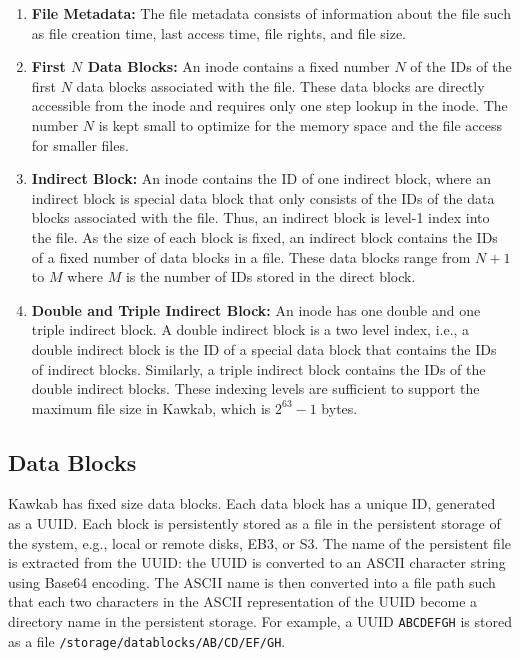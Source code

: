 \documentclass[]{article}
\newcommand{\subtopic}[1]{\vspace{1.5pt} \noindent \textbf{#1}}
\begin{document}
\begin{enumerate}
  \item \subtopic{File Metadata:} The file metadata consists of information
        about the file such as file creation time, last access time, file
        rights, and file size.

	\item \subtopic{First $N$ Data Blocks:} An inode contains a fixed number
$N$ of the IDs of the first $N$ data blocks associated with the file.
These data blocks are directly accessible from the inode and requires
only one step lookup in the inode.
The number $N$ is kept small to optimize for the memory space and the file
access for smaller files. 

  \item \subtopic{Indirect Block:} 
An inode contains the ID of one indirect block, where an indirect block is
special data block that only consists of the IDs of the data blocks associated
with the file. Thus, an indirect block is level-1 index into the file.
As the size of each block is fixed, an indirect block contains the
IDs of a fixed number of data blocks in a file. These data blocks 
range from $N+1$ to $M$ where $M$ is the number of IDs stored in the
direct block.

  \item \subtopic{Double and Triple Indirect Block:}
An inode has one double and one triple indirect block. A double indirect block is a two
level index, i.e., a double indirect block is the ID of a special data block that contains
the IDs of indirect blocks. Similarly, a triple indirect block contains the IDs of the
double indirect blocks. These indexing levels are sufficient to support the maximum 
file size in Kawkab, which is $2^{63}-1$ bytes.

\end{enumerate}

\subsection{Data Blocks} Kawkab has fixed size data blocks. Each data block has
a unique ID, generated as a UUID.  Each block is persistently stored as a file
in the persistent storage of the system, e.g., local or remote disks, EB3, or
S3.  The name of the persistent file is extracted from the UUID: the UUID is
converted to an ASCII character string using Base64 encoding.  The ASCII name
is then converted into a file path such that each two characters in the ASCII
representation of the UUID become a directory name in the persistent storage.
For example, a UUID \texttt{ABCDEFGH} is stored as a file
\texttt{/storage/datablocks/AB/CD/EF/GH}.
\end{document}

